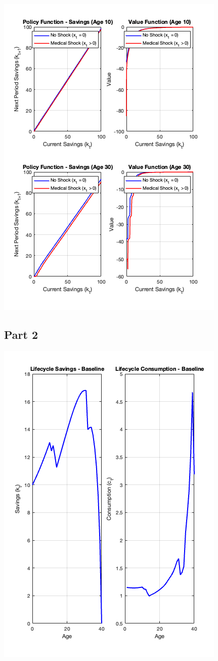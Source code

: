 \documentclass[10pt,a4paper]{article}
\begin{document}
\includegraphics[scale=0.5]{solve_grid.png}

\subsection*{Part 2}

\includegraphics[scale=0.5]{baseline_lifecycle.png}
\end{document}
